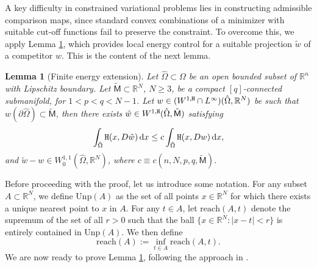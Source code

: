 \documentclass[a4paper]{amsart}
\newtheorem{lemma}[theorem]{Lemma}
\theoremstyle{plain}  %
\numberwithin{equation}{section}
\newcommand{\dd}{\mathrm{d}}
\newcommand{\mm}{\mathsf{M}}
\newcommand{\tx}[1]{\textnormal{\texttt{#1}}}
\begin{document}
\noindent A key difficulty in constrained variational problems lies in constructing admissible comparison maps, since standard convex combinations of a minimizer with suitable cut-off functions fail to preserve the constraint. To overcome this, we apply Lemma \ref{extensiontheorem}, which provides local energy control for a suitable projection $\tilde{w}$ of a competitor $w$. This is the content of the next lemma.
\begin{lemma}[Finite energy extension]\label{extensiontheorem}
Let $\hat{\Omega}\subset\Omega$ be an open bounded subset of $\mathbb{R}^n$ with Lipschitz boundary. Let $\tilde{\mm} \subset \mathbb{R}^N$, $N \geq 3$, be a compact $[q]$-connected submanifold, for $1<p<q<N-1$. Let $w \in (W^{1,\tx{H}} \cap L^{\infty})( \hat{\Omega}, \mathbb{R}^N)$ be such that $w(\partial \hat{\Omega})\subset \tilde{\mm}$, then there exists $\tilde{w} \in W^{1,\tx{H}}( \hat{\Omega}, \tilde{\mm})$ satisfying
\begin{equation}\label{LunaNotas}
\int_{ \hat{\Omega}} \tx{H}(x, D\tilde{w})\,\dd x \leq c \int_{ \hat{\Omega}} \tx{H}(x, Dw)\,\dd x,
\end{equation}
and $\tilde{w}-w\in W^{1,1}_0( \hat{\Omega}, \mathbb{R}^N)$, where $c\equiv c(n,N,p,q,\tilde{\mm})$.
\end{lemma}
\noindent
Before proceeding with the proof, let us introduce some notation. For any subset $A \subset \mathbb{R}^N$, we define \( \text{Unp}(A) \) as the set of all points \( x \in \mathbb{R}^N \) for which there exists a unique nearest point to $x$ in \( A \). For any \( t \in A \), let \( \text{reach}(A, t) \) denote the supremum of the set of all \( r > 0 \) such that the ball \( \{ x \in \mathbb{R}^N : |x - t| < r \} \) is entirely contained in \( \text{Unp}(A) \). We then define
\[
\text{reach}(A) := \inf_{t \in {A}}\text{reach}(A, t).
\]
We are now ready to prove Lemma \ref{extensiontheorem}, following the approach in \cite[Lemma 4.7]{H}.
\end{document}
